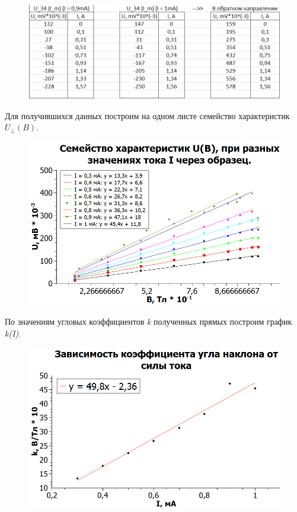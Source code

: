 \documentclass[11pt]{article}
\begin{document}
\begin{figure}[h!]
\centering
\includegraphics[scale=1]{table4.png}
\label{fig:Image1}
\end{figure}

\vspace{0.5cm}

Для получившихся данных построим на одном листе семейство характеристик $U_{\perp}(B)$.

\begin{figure}[h!]
\centering
\includegraphics[scale=1]{Graph1.png}
\label{fig:Image1}
\end{figure}

\vspace{0.5cm}

По значениям угловых коэффициентов \textit{k} полученных прямых построим график \textit{k(I)}.

\begin{figure}[h!]
\centering
\includegraphics[scale=1]{Graph3.png}
\label{fig:Image1}
\end{figure}
\end{document}
